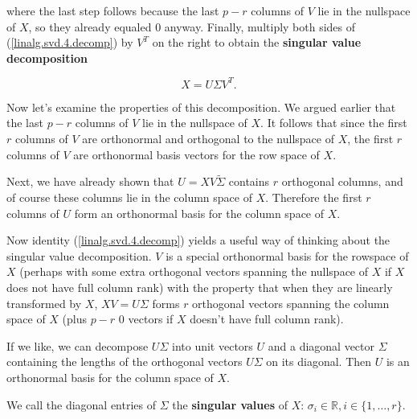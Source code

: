 where the last step follows because the last \(p -r\) columns of \(V\) lie in the nullspace of \(X\), so they already equaled 0 anyway. Finally, multiply both sides of (\ref{linalg.svd.4.decomp}) by \(V^T\) on the right to obtain the \textbf{singular value decomposition}

\[
X = U \Sigma V^T.
\]


Now let's examine the properties of this decomposition. We argued earlier that the last \(p - r\) columns of \(V\) lie in the nullspace of \(X\). It follows that since the first \(r\) columns of \(V\) are orthonormal and orthogonal to the nullspace of \(X\), the first \(r\) columns of \(V\) are orthonormal basis vectors for the row space of \(X\). 

Next, we have already shown that \(U = XV \tilde{\Sigma}\) contains \(r\) orthogonal columns, and of course these columns lie in the column space of \(X\). Therefore the first \(r\) columns of \(U\) form an orthonormal basis for the column space of \(X\).

 
Now identity (\ref{linalg.svd.4.decomp}) yields a useful way of thinking about the singular value decomposition. \(V\) is a special orthonormal basis for the rowspace of \(X\) (perhaps with some extra orthogonal vectors spanning the nullspace of \(X\) if \(X\) does not have full column rank) with the property that when they are linearly transformed by \(X\), \(XV = U \Sigma\) forms \(r\) orthogonal vectors spanning the column space of \(X\) (plus \(p -r\) 0 vectors if \(X\) doesn't have full column rank). 

If we like, we can decompose \(U \Sigma\) into unit vectors \(U\) and a diagonal vector \(\Sigma\) containing the lengths of the orthogonal vectors \(U \Sigma\) on its diagonal. Then \(U\) is an orthonormal basis for the column space of \(X\).

We call the diagonal entries of \(\Sigma\) the \textbf{singular values} of \(X\): \(\sigma_i \in \mathbb{R}, i \in \{1, \ldots, r\}\). 

